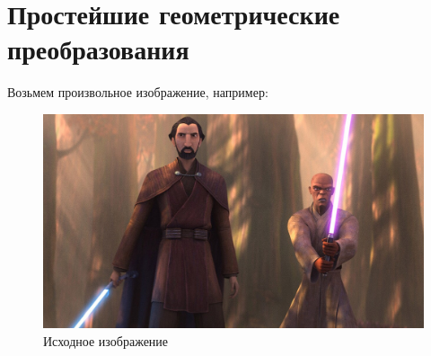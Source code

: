     \section{Простейшие геометрические преобразования}
    Возьмем произвольное изображение, например:
    \begin{figure}[h]
        \centering
        \includegraphics[scale=0.3]{"../images/original/g_disney_talesofthejedi_870_05_47cd6d1c.jpeg"}
        \caption{Исходное изображение}
    \end{figure}
    \\
